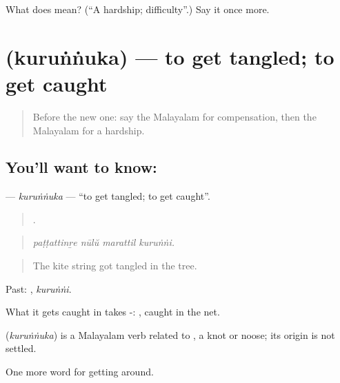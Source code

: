 \begin{tcolorbox}[breakable,colback=teal!4,colframe=teal!35!black,title={Before you move on}]
What does  mean? (\textquotedblleft{}A hardship; difficulty\textquotedblright{}.) Say it once more.
\end{tcolorbox}
\section[\texorpdfstring{\ml{കുരുങ്ങുക} (kuruṅṅuka)}{കുരുങ്ങുക (kuruṅṅuka)}]{ (kuruṅṅuka) — to get tangled; to get caught}

\label{lesson:ML-C515-kurunnuka}



\begin{quote}
Before the new one: say the Malayalam for compensation, then the Malayalam for a hardship.
\end{quote}

\subsection*{You'll want to know: }
\textbf{} — \emph{kuruṅṅuka} — \textquotedblleft{}to get tangled; to get caught\textquotedblright{}.

\begin{quote}
   .
\end{quote}

\begin{quote}
\emph{paṭṭattinṟe nūlŭ marattil kuruṅṅi.}
\end{quote}

\begin{quote}
The kite string got tangled in the tree.
\end{quote}

Past: , \emph{kuruṅṅi}.

What it gets caught in takes -:  , caught in the net.

\begin{cousinweb}
\textbf{} (\emph{kuruṅṅuka}) is a Malayalam verb related to , a knot or noose; its origin is not settled.
\end{cousinweb}

\begin{grammarlens}[title={What you've built}]
One more word for getting around.
\end{grammarlens}

